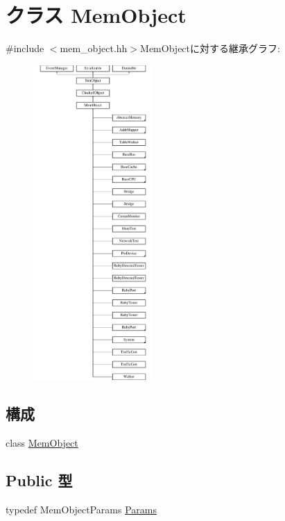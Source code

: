 \hypertarget{classMemObject}{
\section{クラス MemObject}
\label{classMemObject}
}


{\ttfamily \#include $<$mem\_\-object.hh$>$}MemObjectに対する継承グラフ:\begin{figure}[H]
\begin{center}
\leavevmode
\includegraphics[height=12cm]{classMemObject}
\end{center}
\end{figure}
\subsection*{構成}
\begin{DoxyCompactItemize}
\item 
class \hyperlink{classMemObject_1_1MemObject}{MemObject}
\end{DoxyCompactItemize}
\subsection*{Public 型}
\begin{DoxyCompactItemize}
\item 
typedef MemObjectParams \hyperlink{classMemObject_a905bbc621eeec0ed08859e21c8c95412}{Params}
\end{DoxyCompactItemize}

